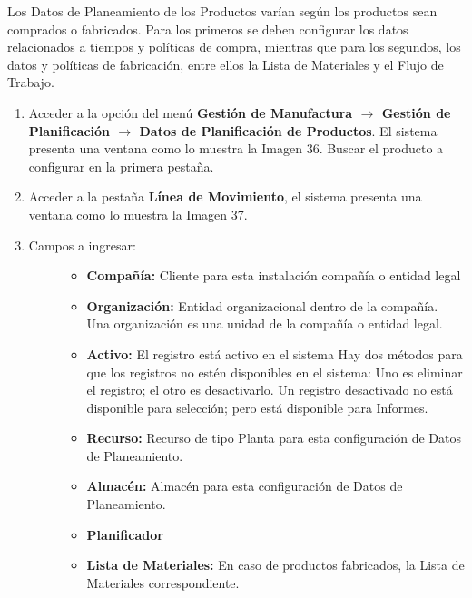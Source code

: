 \documentclass[letterpaper,10pt,spanish]{sphinxmanual}
\begin{document}
Los Datos de Planeamiento de los Productos varían según los productos sean comprados o fabricados. Para los primeros se deben configurar los datos relacionados a tiempos y políticas de compra, mientras que para los segundos, los datos y políticas de fabricación, entre ellos la Lista de Materiales y el Flujo de Trabajo.
\begin{enumerate}
\item {} 
Acceder a la opción del menú \textbf{Gestión de Manufactura \(\rightarrow\)  Gestión de Planificación \(\rightarrow\) Datos de Planificación de Productos}. El sistema presenta una ventana como lo muestra la Imagen 36. Buscar el producto a configurar en la primera pestaña.

\item {} 
Acceder a la pestaña \textbf{Línea de Movimiento}, el sistema presenta una ventana como lo muestra la Imagen 37.

\item {} \begin{description}
\item[{Campos a ingresar:}] \leavevmode\begin{itemize}
\item {} 
\textbf{Compañía:} Cliente para esta instalación compañía o entidad legal

\item {} 
\textbf{Organización:} Entidad organizacional dentro de la compañía. Una organización es una unidad de la compañía o entidad legal.

\item {} 
\textbf{Activo:} El registro está activo en el sistema Hay dos métodos para que los registros no estén disponibles en el sistema: Uno es eliminar el registro; el otro es desactivarlo. Un registro desactivado no está disponible para selección; pero está disponible para Informes.

\item {} 
\textbf{Recurso:} Recurso de tipo Planta para esta configuración de Datos de Planeamiento.

\item {} 
\textbf{Almacén:} Almacén para esta configuración de Datos de Planeamiento.

\item {} 
\textbf{Planificador}

\item {} 
\textbf{Lista de Materiales:} En caso de productos fabricados, la Lista de Materiales correspondiente.


\end{itemize}
\end{description}
\end{enumerate}
\end{document}
